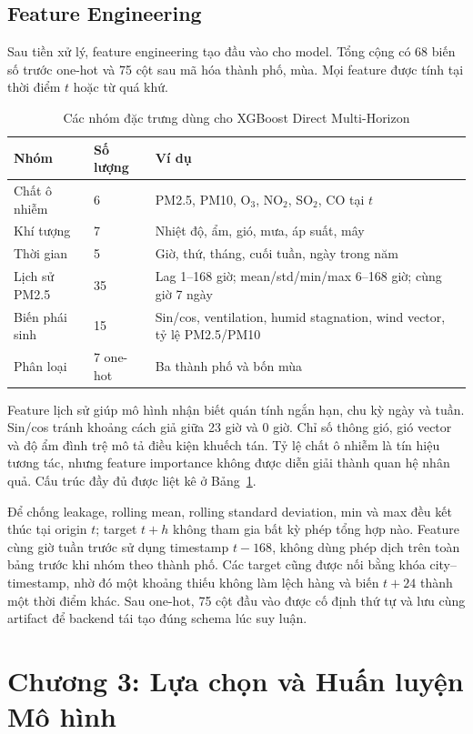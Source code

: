 \documentclass[11pt,a4paper]{article}
\begin{document}
\subsection{Feature Engineering}
Sau tiền xử lý, feature engineering tạo đầu vào cho model. Tổng cộng có 68 biến số trước one-hot và 75 cột sau mã hóa thành phố, mùa. Mọi feature được tính tại thời điểm $t$ hoặc từ quá khứ.

\begin{table}[H]
\centering\small
\caption{Các nhóm đặc trưng dùng cho XGBoost Direct Multi-Horizon}
\label{tab:features}
\begin{tabular}{p{3.4cm}p{2cm}p{9.1cm}}
\toprule
Nhóm & Số lượng & Ví dụ\\
\midrule
Chất ô nhiễm & 6 & PM2.5, PM10, O$_3$, NO$_2$, SO$_2$, CO tại $t$\\
Khí tượng & 7 & Nhiệt độ, ẩm, gió, mưa, áp suất, mây\\
Thời gian & 5 & Giờ, thứ, tháng, cuối tuần, ngày trong năm\\
Lịch sử PM2.5 & 35 & Lag 1--168 giờ; mean/std/min/max 6--168 giờ; cùng giờ 7 ngày\\
Biến phái sinh & 15 & Sin/cos, ventilation, humid stagnation, wind vector, tỷ lệ PM2.5/PM10\\
Phân loại & 7 one-hot & Ba thành phố và bốn mùa\\
\bottomrule
\end{tabular}
\end{table}

Feature lịch sử giúp mô hình nhận biết quán tính ngắn hạn, chu kỳ ngày và tuần. Sin/cos tránh khoảng cách giả giữa 23 giờ và 0 giờ. Chỉ số thông gió, gió vector và độ ẩm đình trệ mô tả điều kiện khuếch tán. Tỷ lệ chất ô nhiễm là tín hiệu tương tác, nhưng feature importance không được diễn giải thành quan hệ nhân quả. Cấu trúc đầy đủ được liệt kê ở Bảng~\ref{tab:features}.

Để chống leakage, rolling mean, rolling standard deviation, min và max đều kết thúc tại origin $t$; target $t+h$ không tham gia bất kỳ phép tổng hợp nào. Feature cùng giờ tuần trước sử dụng timestamp $t-168$, không dùng phép dịch trên toàn bảng trước khi nhóm theo thành phố. Các target cũng được nối bằng khóa city--timestamp, nhờ đó một khoảng thiếu không làm lệch hàng và biến $t+24$ thành một thời điểm khác. Sau one-hot, 75 cột đầu vào được cố định thứ tự và lưu cùng artifact để backend tái tạo đúng schema lúc suy luận.

\section{Chương 3: Lựa chọn và Huấn luyện Mô hình}
\end{document}
